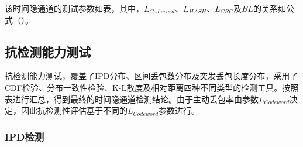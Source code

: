 
该时间隐通道的测试参数如表，其中，$L_{Codeword}$、$L_{HASH}$、$L_{CRC}$及$BL$的关系如公式（）。

\subsection{抗检测能力测试}
\label{chap:hash:result:undetectability}

抗检测能力测试，覆盖了IPD分布、区间丢包数分布及突发丢包长度分布，采用了CDF检验、分布一致性检验、K-L散度及相对距离四种不同类型的检测工具。按照表进行汇总，得到最终的时间隐通道检测结论。由于主动丢包率由参数$L_{Codeword}$决定，因此抗检测性评估基于不同的$L_{Codeword}$参数进行。

\subsubsection{IPD检测}
\label{chap:hash:result:undetectability:ipd}


